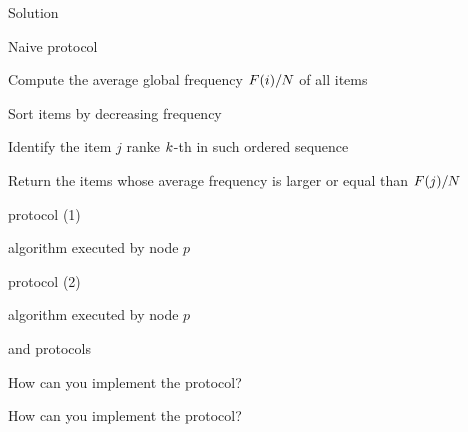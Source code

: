 \begin{frame}{Solution}
	
\begin{block}{Naive protocol}
\BI
\item Compute the \alert{average global frequency} $F(i)/N$ of all items
\item Sort items by decreasing frequency
\item Identify the item $j$ ranke $k$-th in such ordered sequence
\item Return the items whose average frequency is larger or equal
than $F(j)/N$
\EI
\end{block}
	
\end{frame}

\begin{frame}{\FreqMF protocol (1)}
	\begin{Procedure}

\caption{\FreqMF algorithm executed by node $p$}

\BlankLine
{}
\BlankLine
{}
\end{Procedure}

\end{frame}

\begin{frame}{\FreqMF protocol (2)}
	\begin{Procedure}

\caption{\FreqMF algorithm executed by node $p$}

\BlankLine
{}
\end{Procedure}

\end{frame}

\begin{frame}{\FreqAF and \FreqRF protocols}
	
\BI
\item How can you implement the \FreqAF protocol?
\item How can you implement the \FreqRF protocol?
\EI

\end{frame}

